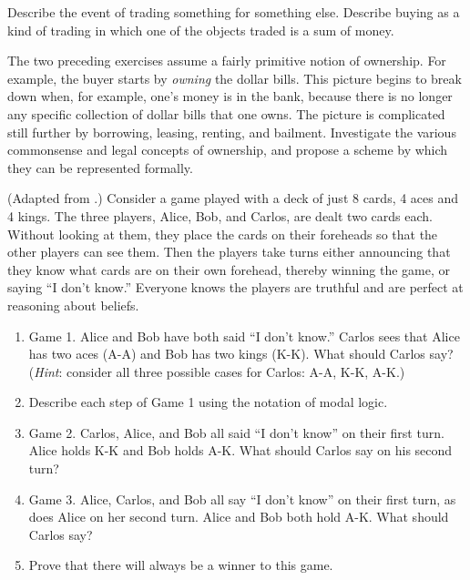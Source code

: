 \begin{exercise}
Describe the event of trading something for something
else.  Describe buying as a kind of trading in which one of the objects
traded is a sum of money.
\end{exercise} 

\begin{exercise} \libex
The two preceding exercises assume a fairly primitive notion of
ownership. For example, the buyer starts by {\em owning} the dollar
bills. This picture begins to break down when, for example, one's
money is in the bank, because there is no longer any specific
collection of dollar bills that one owns. The picture is complicated
still further by borrowing, leasing, renting, and
bailment. Investigate the various commonsense and legal concepts of
ownership, and propose a scheme by which they can be represented
formally.
\end{exercise} 



\begin{exercise}
(Adapted from .) Consider a game played with
a deck of just 8 cards, 4 aces and 4 kings.  The three players, Alice, Bob,
and Carlos, are dealt two cards each.  Without looking at them, they
place the cards on their foreheads so that the other players can see
them. Then the players take turns either
announcing that they know what cards are on their own forehead, thereby winning the game, or
saying ``I don't know.'' Everyone knows the players are truthful and are
perfect at reasoning about beliefs.
\begin{enumerate}
\item Game 1. Alice and Bob have both said ``I don't know.'' Carlos
sees that Alice has two aces (A-A) and Bob has two kings (K-K).  What should
Carlos say? ({\em Hint}: consider all three possible cases for Carlos: A-A, K-K, A-K.)
\item Describe each step of Game 1 using the notation of modal logic.
\item Game 2. Carlos, Alice, and Bob all said ``I don't know'' on their first turn.
Alice holds K-K and Bob holds A-K. What should Carlos say on his second turn?
\item Game 3. Alice, Carlos, and Bob all say ``I don't know'' on their first turn,
as does Alice on her second turn. Alice and Bob both hold A-K. What should
Carlos say?
\item Prove that there will always be a winner to this game.
\end{enumerate}
\end{exercise} 

